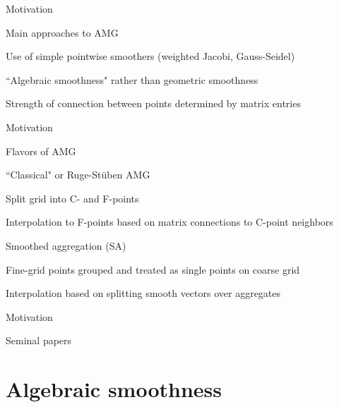 \documentclass[18pt,xcolor=table]{beamer}
\begin{document}
\begin{frame}{Motivation}
\begin{block}{Main approaches to AMG}
\bit
\item Use of simple pointwise smoothers (weighted Jacobi, Gauss-Seidel)
\item ``Algebraic smoothness" rather than geometric smoothness
\item Strength of connection between points determined by matrix entries
\eit
\end{block}
\end{frame}

\begin{frame}{Motivation}
\begin{block}{Flavors of AMG}
\bit
\item ``Classical" or Ruge-St\"uben AMG
\bit
\item Split grid into C- and F-points
\item Interpolation to F-points based on matrix connections to C-point neighbors
\eit
\item Smoothed aggregation (SA)
\bit
\item Fine-grid points grouped and treated as single points on coarse grid
\item Interpolation based on splitting smooth vectors over aggregates
\eit
\eit
\end{block}
\end{frame}

\begin{frame}{Motivation}
\begin{block}{Seminal papers}
\bit
\item 
\eit
\end{block}
\end{frame}



\section{Algebraic smoothness}

\begin{frame}{}
\begin{block}{}
\bit
\item 
\eit
\end{block}
\end{frame}
\end{document}
